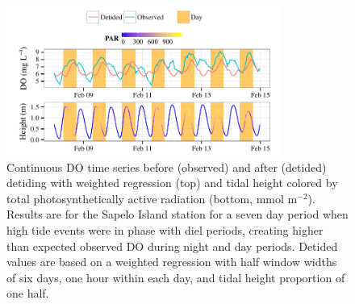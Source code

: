 \documentclass[letterpaper,12pt,oneside]{article}\usepackage[]{graphicx}\usepackage[]{color}
\newenvironment{knitrout}{}{} %
\begin{document}
\centering\vspace*{\fill}
\begin{knitrout}
\color{fgcolor}\begin{figure}[!ht]


{\centering \includegraphics[width=0.8\textwidth]{figure/phase_in} 

}

\caption[Continuous \ac{DO} time series before (observed) and after (detided) detiding with weighted regression (top) and tidal height colored by total photosynthetically active radiation (bottom, mmol m$^{-2}$)]{Continuous \ac{DO} time series before (observed) and after (detided) detiding with weighted regression (top) and tidal height colored by total photosynthetically active radiation (bottom, mmol m$^{-2}$). Results are for the Sapelo Island station for a seven day period when high tide events were in phase with diel periods, creating higher than expected observed \ac{DO} during night and day periods. Detided values are based on a weighted regression with half window widths of six days, one hour within each day, and tidal height proportion of one half.\label{fig:phase_in}}
\end{figure}


\end{knitrout}
\vfill
\clearpage
\end{document}
